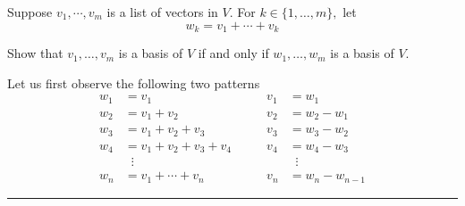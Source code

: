 \begin{xrcs}
  Suppose $v_1, \cdots, v_m$ is a list of vectors in $V$. For $k \in \{1, \ldots, m\},$ let
  \begin{equation}
    w_k = v_1 + \cdots + v_k
  \end{equation}

  Show that $v_1, \ldots, v_m$ is a basis of $V$ if and only if $w_1, \ldots, w_m$ is a basis of $V$.

  \begin{xprf}
    Let us first observe the following two patterns
    \begin{equation}
      \begin{aligned}
        w_1 &= v_1                    & \qquad v_1 &= w_1       \\
        w_2 &= v_1 + v_2              & \qquad v_2 &= w_2 - w_1 \\
        w_3 &= v_1 + v_2 + v_3        & \qquad v_3 &= w_3 - w_2 \\
        w_4 &= v_1 + v_2 + v_3 + v_4  & \qquad v_4 &= w_4 - w_3 \\
        &\;\;\vdots               &            &\;\;\vdots \\
        w_n &= v_1 + \cdots + v_n     & \qquad v_n &= w_n - w_{n-1}
      \end{aligned}
    \end{equation}
  \end{xprf}
\end{xrcs}


\phantom{.}

\hrule
